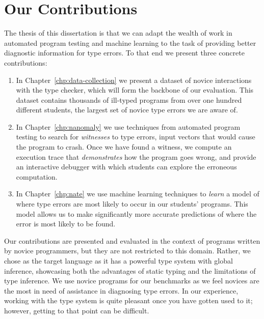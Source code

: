 %



\section{Our Contributions}
\label{sec:our-contributions}

The thesis of this dissertation is that we can adapt the wealth of work
in automated program testing and machine learning to the task of
providing better diagnostic information for type errors.
%
To that end we present three concrete contributions:
%
\begin{enumerate}
\item In Chapter~\ref{chp:data-collection} we present a dataset of
  novice interactions with the \ocaml type checker, which will form the
  backbone of our evaluation.
  This dataset contains thousands of ill-typed programs from over one
  hundred different students, the largest set of novice type errors we
  are aware of.
\item In Chapter~\ref{chp:nanomaly} we use techniques from automated
  program testing to search for \emph{witnesses} to type errors, \ie
  input vectors that would cause the program to crash.
  Once we have found a witness, we compute an execution trace that
  \emph{demonstrates} how the program goes wrong, and provide an
  interactive debugger with which students can explore the erroneous
  computation.

\item In Chapter~\ref{chp:nate} we use machine learning techniques to
  \emph{learn} a model of where type errors are most likely to occur in
  our students' programs.
  This model allows us to make significantly more accurate predictions
  of where the error is most likely to be found.
\end{enumerate}

Our contributions are presented and evaluated in the context of \ocaml
programs written by novice programmers, but they are not restricted to
this domain.
%
Rather, we chose \ocaml as the target language as it has a powerful type
system with global inference, showcasing both the advantages of static
typing and the limitations of type inference.
%
We use novice programs for our benchmarks as we feel novices are the
most in need of assistance in diagnosing type errors.
%
In our experience, working with the type system is quite pleasant
once you have gotten used to it; however, getting to that point can be
difficult.
%

